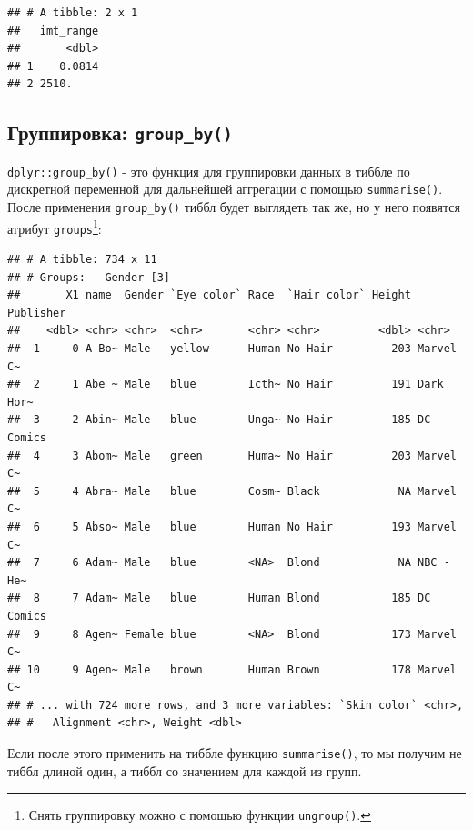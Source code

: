 \documentclass[]{book}
\newenvironment{Shaded}{\begin{snugshade}}{\end{snugshade}}
\newcommand{\KeywordTok}[1]{\textcolor[rgb]{0.13,0.29,0.53}{\textbf{#1}}}
\newcommand{\StringTok}[1]{\textcolor[rgb]{0.31,0.60,0.02}{#1}}
\newcommand{\OperatorTok}[1]{\textcolor[rgb]{0.81,0.36,0.00}{\textbf{#1}}}
\newcommand{\NormalTok}[1]{#1}
\begin{document}
\begin{verbatim}
## # A tibble: 2 x 1
##   imt_range
##       <dbl>
## 1    0.0814
## 2 2510.
\end{verbatim}

\subsection{\texorpdfstring{Группировка:
\texttt{group\_by()}}{Группировка: group\_by()}}\label{tidy_group}

\texttt{dplyr::group\_by()} - это функция для группировки данных в
тиббле по дискретной переменной для дальнейшей аггрегации с помощью
\texttt{summarise()}. После применения \texttt{group\_by()} тиббл будет
выглядеть так же, но у него появятся атрибут \texttt{groups}\footnote{Снять
  группировку можно с помощью функции \texttt{ungroup()}.}:

\begin{Shaded}
\end{Shaded}

\begin{verbatim}
## # A tibble: 734 x 11
## # Groups:   Gender [3]
##       X1 name  Gender `Eye color` Race  `Hair color` Height Publisher
##    <dbl> <chr> <chr>  <chr>       <chr> <chr>         <dbl> <chr>    
##  1     0 A-Bo~ Male   yellow      Human No Hair         203 Marvel C~
##  2     1 Abe ~ Male   blue        Icth~ No Hair         191 Dark Hor~
##  3     2 Abin~ Male   blue        Unga~ No Hair         185 DC Comics
##  4     3 Abom~ Male   green       Huma~ No Hair         203 Marvel C~
##  5     4 Abra~ Male   blue        Cosm~ Black            NA Marvel C~
##  6     5 Abso~ Male   blue        Human No Hair         193 Marvel C~
##  7     6 Adam~ Male   blue        <NA>  Blond            NA NBC - He~
##  8     7 Adam~ Male   blue        Human Blond           185 DC Comics
##  9     8 Agen~ Female blue        <NA>  Blond           173 Marvel C~
## 10     9 Agen~ Male   brown       Human Brown           178 Marvel C~
## # ... with 724 more rows, and 3 more variables: `Skin color` <chr>,
## #   Alignment <chr>, Weight <dbl>
\end{verbatim}

Если после этого применить на тиббле функцию \texttt{summarise()}, то мы
получим не тиббл длиной один, а тиббл со значением для каждой из групп.
\end{document}
